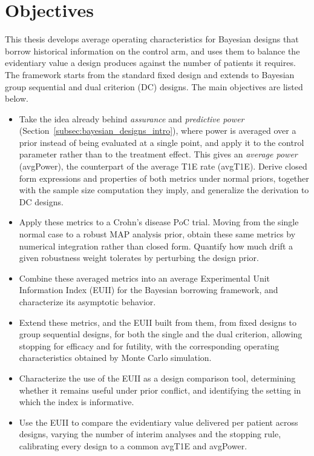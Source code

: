 \section{Objectives}

This thesis develops average operating characteristics for Bayesian designs that borrow historical
information on the control arm, and uses them to balance the evidentiary value a design produces
against the number of patients it requires. The framework starts from the standard fixed design
and extends to Bayesian group sequential and dual criterion (DC) designs.
The main objectives are listed below.

\begin{itemize}
    \item Take the idea already behind \textit{assurance} and \textit{predictive power}
    (Section~\ref{subsec:bayesian_designs_intro}), where power is averaged over a prior instead of being
    evaluated at a single point, and apply it to the control parameter rather than to the treatment effect.
    This gives an \textit{average power} (avgPower), the counterpart of the average T1E rate (avgT1E). Derive closed form
    expressions and properties of both metrics under normal priors, together with the sample size computation
    they imply, and generalize the derivation to DC designs.

    \item Apply these metrics to a Crohn's disease PoC trial. Moving from the single normal case to a
    robust MAP analysis prior, obtain these same metrics by numerical integration rather than closed
    form. Quantify how much drift a given robustness weight tolerates by perturbing the
    design prior.

    \item Combine these averaged metrics into an average Experimental Unit Information Index
    (EUII) for the Bayesian borrowing framework, and characterize its asymptotic behavior.

    \item Extend these metrics, and the EUII built from them, from fixed designs to group sequential
    designs, for both the single and the dual criterion, allowing stopping for efficacy and for
    futility, with the corresponding operating characteristics obtained by Monte Carlo simulation.

    \item Characterize the use of the EUII as a design comparison tool, determining whether it remains
    useful under prior conflict, and identifying the setting in which the index is informative.

    \item Use the EUII to compare the evidentiary value delivered per patient across designs, varying
    the number of interim analyses and the stopping rule, calibrating every design to
    a common avgT1E and avgPower.

\end{itemize}


